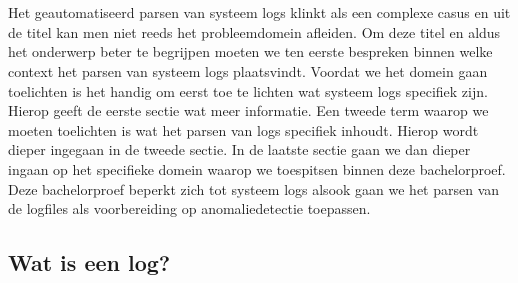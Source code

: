 
\chapter{}
\label{ch:inleiding}



Het geautomatiseerd parsen van systeem logs klinkt als een complexe casus en uit de titel kan men niet reeds het probleemdomein afleiden. Om deze titel en aldus het onderwerp beter te begrijpen moeten we ten eerste bespreken binnen welke context het parsen van systeem logs plaatsvindt. Voordat we het domein gaan toelichten is het handig om eerst toe te lichten wat systeem logs specifiek zijn. Hierop geeft de eerste sectie wat meer informatie. Een tweede term waarop we moeten toelichten is wat het parsen van logs specifiek inhoudt. Hierop wordt dieper ingegaan in de tweede sectie. In de laatste sectie gaan we dan dieper ingaan op het specifieke domein waarop we toespitsen binnen deze bachelorproef. Deze bachelorproef beperkt zich tot systeem logs alsook gaan we het parsen van de logfiles als voorbereiding op anomaliedetectie toepassen. 

\section{Wat is een log?}


